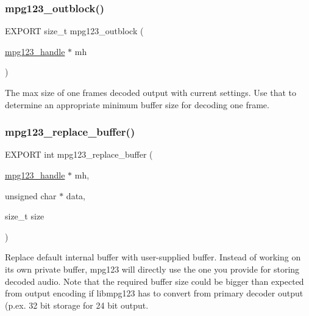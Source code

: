 \subsubsection{\texorpdfstring{mpg123\+\_\+outblock()}{mpg123\_outblock()}}
{\footnotesize\ttfamily E\+X\+P\+O\+RT size\+\_\+t mpg123\+\_\+outblock (\begin{DoxyParamCaption}\item[{\hyperlink{group__mpg123__init_ga6728e2839a395f3a07d4514da659faca}{mpg123\+\_\+handle} $\ast$}]{mh }\end{DoxyParamCaption})}

The max size of one frame\textquotesingle{}s decoded output with current settings. Use that to determine an appropriate minimum buffer size for decoding one frame. \mbox{\label{group__mpg123__lowio_ga4004912737be35ad51ff4dac17022407}} 
\subsubsection{\texorpdfstring{mpg123\+\_\+replace\+\_\+buffer()}{mpg123\_replace\_buffer()}}
{\footnotesize\ttfamily E\+X\+P\+O\+RT int mpg123\+\_\+replace\+\_\+buffer (\begin{DoxyParamCaption}\item[{\hyperlink{group__mpg123__init_ga6728e2839a395f3a07d4514da659faca}{mpg123\+\_\+handle} $\ast$}]{mh,  }\item[{unsigned char $\ast$}]{data,  }\item[{size\+\_\+t}]{size }\end{DoxyParamCaption})}

Replace default internal buffer with user-\/supplied buffer. Instead of working on it\textquotesingle{}s own private buffer, mpg123 will directly use the one you provide for storing decoded audio. Note that the required buffer size could be bigger than expected from output encoding if libmpg123 has to convert from primary decoder output (p.\+ex. 32 bit storage for 24 bit output. \mbox{\label{group__mpg123__lowio_ga8112b25fedb2d52c76abb1b103e6e2cc}} 
